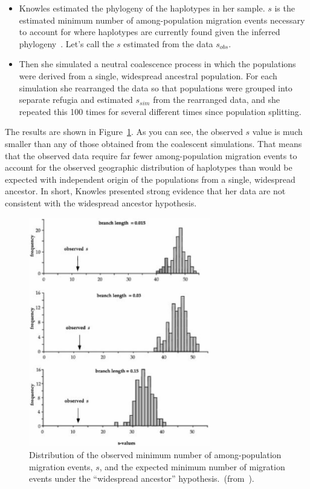 \documentclass[12pt]{article}
\begin{document}
\begin{itemize}

\item Knowles estimated the phylogeny of the haplotypes in her
  sample. $s$ is the estimated minimum number of among-population
  migration events necessary to account for where haplotypes are
  currently found given the inferred
  phylogeny~\cite{Slatkin-Maddison-1989}. Let's call the $s$ estimated
  from the data $s_{obs}$.

\item Then she simulated a neutral coalescence process in which the
  populations were derived from a single, widespread ancestral
  population. For each simulation she rearranged the data so that
  populations were grouped into separate refugia and estimated $s_{sim}$
  from the rearranged data, and she repeated this 100 times for
  several different times since population splitting.

\end{itemize}

\noindent The results are shown in
Figure~\ref{fig:knowles-s-values}. As you can see, the observed $s$
value is much smaller than any of those obtained from the coalescent
simulations. That means that the observed data require far fewer
among-population migration events to account for the observed
geographic distribution of haplotypes than would be expected with
independent origin of the populations from a single, widespread
ancestor. In short, Knowles presented strong evidence that her data
are not consistent with the widespread ancestor
hypothesis.

\begin{figure}
\begin{center}
\includegraphics[height=10cm]{knowles-s-values.eps}
\end{center}
\caption{Distribution of the observed minimum number of
  among-population migration events, $s$, and the expected minimum
  number of migration events under the ``widespread ancestor''
  hypothesis.~(from~\cite{Knowles-2001}).}\label{fig:knowles-s-values}
\end{figure}
\end{document}

